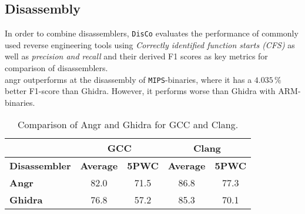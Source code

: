 \documentclass[seminar]{plai}
\begin{document}
\begin{table}[h]
\centering
{}
\caption{Comparison of Angr and Ghidra for Recompile Success Rate and Coverage Equivalence Rate.\cite{decompileBench-comprehensice-benchmark-for-evaluating-decompilers-in-real-world-scenarios}}
\label{sec:decompileBench-comparison}
\end{table}

\subsection{Disassembly}
In order to combine disassemblers, \texttt{DisCo} evaluates the performance of commonly used reverse engineering tools using \textit{Correctly identified function starts (CFS)} as well as \textit{precision and recall} and their derived F1 scores as key metrics for comparison of disassemblers.\\
angr outperforms at the disassembly of \texttt{MIPS}-binaries, where it has a $4.035\,\%$ better F1-score than Ghidra.
However, it performs worse than Ghidra with \texttt{}{ARM}-binaries.
\begin{table}[H]
\centering
\begin{tabular}{|l|c|c||c|c|}
\hline
 & \multicolumn{2}{c||}{\textbf{GCC}} & \multicolumn{2}{c|}{\textbf{Clang}} \\
\hline
\textbf{Disassembler} & \textbf{Average} & \textbf{5PWC} & \textbf{Average} & \textbf{5PWC} \\
\hline
\textbf{Angr}   & 82.0 & 71.5 & 86.8 & 77.3 \\
\hline
\textbf{Ghidra} & 76.8 & 57.2 & 85.3 & 70.1 \\
\hline
\end{tabular}
\caption{Comparison of Angr and Ghidra for GCC and Clang.\cite{DisCo-combining-disassemblers-for-improved-performance}}
\end{table}
\end{document}
